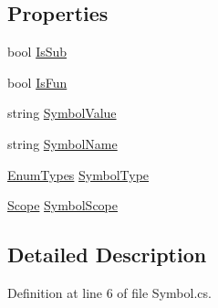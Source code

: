 \subsection*{Properties}
\begin{DoxyCompactItemize}
\item 
bool \hyperlink{class_c_p_u___o_s___simulator_1_1_compiler_1_1_frontend_1_1_symbols_1_1_symbol_a23ecebb867e96bd9e6c5a07ad7776903}{Is\+Sub}
\item 
bool \hyperlink{class_c_p_u___o_s___simulator_1_1_compiler_1_1_frontend_1_1_symbols_1_1_symbol_a21f3b82dfe8cb700636c128d9e435161}{Is\+Fun}
\item 
string \hyperlink{class_c_p_u___o_s___simulator_1_1_compiler_1_1_frontend_1_1_symbols_1_1_symbol_a2b91f23039d826f890bf806bd43b10cb}{Symbol\+Value}
\item 
string \hyperlink{class_c_p_u___o_s___simulator_1_1_compiler_1_1_frontend_1_1_symbols_1_1_symbol_a869e163bccaf173b44fc04bb0488ead0}{Symbol\+Name}
\item 
\hyperlink{namespace_c_p_u___o_s___simulator_1_1_compiler_1_1_frontend_1_1_tokens_a7c0cc43763cc9d01c7d5af34d70b96ea}{Enum\+Types} \hyperlink{class_c_p_u___o_s___simulator_1_1_compiler_1_1_frontend_1_1_symbols_1_1_symbol_a8324487c804b0bcb8910ef82033f749d}{Symbol\+Type}
\item 
\hyperlink{class_c_p_u___o_s___simulator_1_1_compiler_1_1_frontend_1_1_symbols_1_1_scope}{Scope} \hyperlink{class_c_p_u___o_s___simulator_1_1_compiler_1_1_frontend_1_1_symbols_1_1_symbol_acba5080166e9021bf92e829785118a9c}{Symbol\+Scope}
\end{DoxyCompactItemize}


\subsection{Detailed Description}


Definition at line 6 of file Symbol.\+cs.



